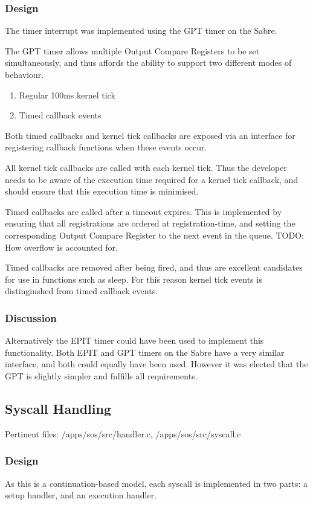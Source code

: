 \documentclass[a4paper,12pt]{article}
\begin{document}
\subsubsection{Design}
The timer interrupt was implemented using the GPT timer on the Sabre.

The GPT timer allows multiple Output Compare Registers to be set
simultaneously, and thus affords the ability to support two different modes of
behaviour.

\begin{enumerate}
\item Regular 100ms kernel tick
\item Timed callback events
\end{enumerate}

Both timed callbacks and kernel tick callbacks are exposed via an interface
for registering callback functions when these events occur.

All kernel tick callbacks are called with each kernel tick.  Thus the
developer needs to be aware of the execution time required for a kernel tick
callback, and should ensure that this execution time is minimised.

Timed callbacks are called after a timeout expires.  This is implemented by
ensuring that all registrations are ordered at registration-time, and setting
the corresponding Output Compare Register to the next event in the queue.
TODO: How overflow is accounted for.

Timed callbacks are removed after being fired, and thus are excellent
candidates for use in functions such as sleep.  For this reason kernel tick
events is distingiushed from timed callback events.

\subsubsection{Discussion}
Alternatively the EPIT timer could have been used to implement this
functionality.  Both EPIT and GPT timers on the Sabre have a very similar
interface, and both could equally have been used.  However it was elected that
the GPT is slightly simpler and fulfills all requirements.

\subsection{Syscall Handling}
Pertinent files: /apps/sos/src/handler.c, /apps/sos/src/syscall.c

\subsubsection{Design}
As this is a continuation-based model, each syscall is implemented in two
parts: a setup handler, and an execution handler.
\end{document}
